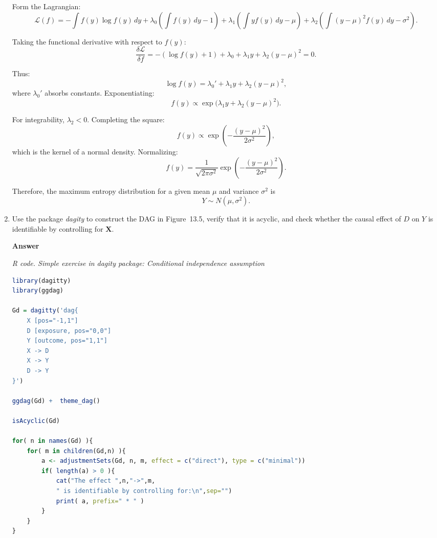 \begin{enumerate}[leftmargin=*]
Form the Lagrangian:
\[
\mathcal{L}(f) = - \int f(y)\log f(y) \, dy 
+ \lambda_0 \left( \int f(y)\, dy - 1\right)
+ \lambda_1 \left( \int y f(y)\, dy - \mu \right)
+ \lambda_2 \left( \int (y-\mu)^2 f(y)\, dy - \sigma^2 \right).
\]

Taking the functional derivative with respect to $f(y)$:
\[
\frac{\delta \mathcal{L}}{\delta f} = -(\log f(y) + 1) + \lambda_0 + \lambda_1 y + \lambda_2 (y-\mu)^2 = 0.
\]

Thus:
\[
\log f(y) = \lambda_0' + \lambda_1 y + \lambda_2 (y-\mu)^2,
\]
where $\lambda_0'$ absorbs constants. Exponentiating:
\[
f(y) \propto \exp\big( \lambda_1 y + \lambda_2 (y-\mu)^2 \big).
\]

For integrability, $\lambda_2 < 0$. Completing the square:
\[
f(y) \propto \exp\left( -\frac{(y-\mu)^2}{2\sigma^2} \right),
\]
which is the kernel of a normal density. Normalizing:
\[
f(y) = \frac{1}{\sqrt{2\pi\sigma^2}} \exp\left( -\frac{(y-\mu)^2}{2\sigma^2} \right).
\]

Therefore, the maximum entropy distribution for a given mean $\mu$ and variance $\sigma^2$ is
\[
Y \sim N(\mu, \sigma^2).
\]

\item Use the package \textit{dagity} to construct the DAG in Figure~13.5, verify that it is acyclic, and check whether the causal effect of \(D\) on \(Y\) is identifiable by controlling for \(\mathbf{X}\).

\textbf{Answer}

\begin{tcolorbox}[enhanced,width=4.67in,center upper,
	fontupper=\large\bfseries,drop shadow southwest,sharp corners]
	\textit{R code. Simple exercise in \textit{dagity} package: Conditional independence assumption}
	\begin{VF}
		\begin{lstlisting}[language=R]		
library(dagitty)
library(ggdag)

Gd = dagitty('dag{
	X [pos="-1,1"]
	D [exposure, pos="0,0"]
	Y [outcome, pos="1,1"]
	X -> D
	X -> Y
	D -> Y
}')

ggdag(Gd) +  theme_dag()

isAcyclic(Gd)

for( n in names(Gd) ){
	for( m in children(Gd,n) ){
		a <- adjustmentSets(Gd, n, m, effect = c("direct"), type = c("minimal"))
		if( length(a) > 0 ){
			cat("The effect ",n,"->",m,
			" is identifiable by controlling for:\n",sep="")
			print( a, prefix=" * " )
		}
	}
}
\end{lstlisting}
	\end{VF}
\end{tcolorbox} 


\end{enumerate}
